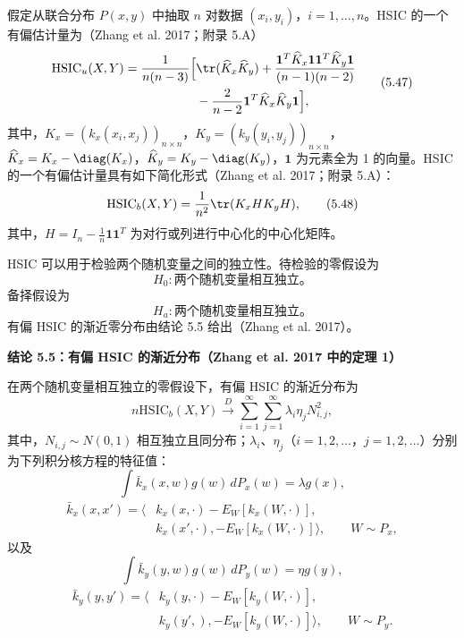 
假定从联合分布 $P(x,y)$ 中抽取 $n$ 对数据 $(x_i,y_i)$，$i=1,\ldots,n$。HSIC 的一个有偏估计量为（Zhang et al. 2017；附录 5.A）
\begin{equation}
\begin{aligned}
\mathrm{HSIC}_u(X,Y)=\frac1{n(n-3)}\Bigl[{}&\tr(\widehat K_x\widehat K_y)
+\frac{\mathbf1^T\widehat K_x\mathbf1\mathbf1^T\widehat K_y\mathbf1}{(n-1)(n-2)}\\
&-\frac2{n-2}\mathbf1^T\widehat K_x\widehat K_y\mathbf1\Bigr],
\end{aligned}
\tag{5.47}
\end{equation}
其中，$K_x=(k_x(x_i,x_j))_{n\times n}$，$K_y=(k_y(y_i,y_j))_{n\times n}$，$\widehat K_x=K_x-\diag(K_x)$，$\widehat K_y=K_y-\diag(K_y)$，$\mathbf1$ 为元素全为 1 的向量。HSIC 的一个有偏估计量具有如下简化形式（Zhang et al. 2017；附录 5.A）：
\begin{equation}
\mathrm{HSIC}_b(X,Y)=\frac1{n^2}\tr(K_xHK_yH),
\tag{5.48}
\end{equation}
其中，$H=I_n-\frac1n\mathbf1\mathbf1^T$ 为对行或列进行中心化的中心化矩阵。


HSIC 可以用于检验两个随机变量之间的独立性。待检验的零假设为
\[
H_0:\text{两个随机变量相互独立。}
\]
备择假设为
\[
H_a:\text{两个随机变量相互独立。}
\]
有偏 HSIC 的渐近零分布由结论 5.5 给出（Zhang et al. 2017）。

\par\medskip{}
\noindent\textbf{结论 5.5：有偏 HSIC 的渐近分布（Zhang et al. 2017 中的定理 1）}\par
在两个随机变量相互独立的零假设下，有偏 HSIC 的渐近分布为
\begin{equation}
n\mathrm{HSIC}_b(X,Y)\xrightarrow{D}
\sum_{i=1}^\infty\sum_{j=1}^\infty\lambda_i\eta_jN_{i,j}^2,
\tag{5.49}
\end{equation}
其中，$N_{i,j}\sim N(0,1)$ 相互独立且同分布；$\lambda_i$、$\eta_j$（$i=1,2,\ldots$，$j=1,2,\ldots$）分别为下列积分核方程的特征值：
\[
\int\bar k_x(x,w)g(w)\,dP_x(w)=\lambda g(x),
\]
\[
\begin{aligned}
\bar k_x(x,x')
=\bigl\langle{}&k_x(x,\cdot)-E_W[k_x(W,\cdot)],\\
&k_x(x',\cdot),-E_W[k_x(W,\cdot)]\bigr\rangle,\qquad W\sim P_x,
\end{aligned}
\]
以及
\[
\int\bar k_y(y,w)g(w)\,dP_y(w)=\eta g(y),
\]
\[
\begin{aligned}
\bar k_y(y,y')
=\bigl\langle{}&k_y(y,\cdot)-E_W[k_y(W,\cdot)],\\
&k_y(y',),-E_W[k_y(W,\cdot)]\bigr\rangle,\qquad W\sim P_y.
\end{aligned}
\]

